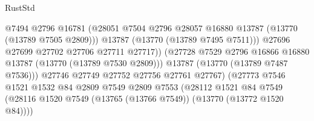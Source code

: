 \begin{lexlean}{RustStd}
\begin{coremodule}
                                              @7494
                                              @2796
                                              @16781
                                              (@28051
                                                @7504
                                                @2796
                                                @28057
                                                @16880
                                                @13787
                                                (@13770 (@13789 @7505 @2809)))
                                              @13787
                                              (@13770 (@13789 @7495 @7511)))
                                            @27696
                                            @27699
                                            @27702
                                            @27706
                                            @27711
                                            @27717))
                                        (@27728
                                          @7529
                                          @2796
                                          @16866
                                          @16880
                                          @13787
                                          (@13770 (@13789 @7530 @2809)))
                                        @13787
                                        (@13770 (@13789 @7487 @7536)))
                                      @27746
                                      @27749
                                      @27752
                                      @27756
                                      @27761
                                      @27767)
                                    (@27773
                                      @7546
                                      @1521
                                      @1532
                                      @84
                                      @2809
                                      @7549
                                      @2809
                                      @7553
                                      (@28112
                                        @1521
                                        @84
                                        @7549
                                        (@28116
                                          @1520
                                          @7549
                                          (@13765 (@13766 @7549))
                                          (@13770 (@13772 @1520 @84))))

\end{coremodule}
\end{lexlean}
